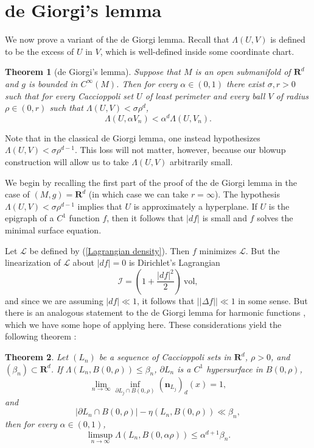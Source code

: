\documentclass[reqno,12pt,letterpaper]{amsart}
\newcommand{\RR}{\mathbf{R}}
\newcommand{\normal}{\mathbf n}
\newcommand{\vol}{\mathrm{vol}}
\newtheorem{theorem}{Theorem}[section]
\theoremstyle{definition}
\numberwithin{equation}{section}
\begin{document}

\section{de Giorgi's lemma}\label{DGL section}
We now prove a variant of the de Giorgi lemma. Recall that $\Lambda(U, V)$ is defined to be the excess of $U$ in $V$, which is well-defined inside some coordinate chart.

\begin{theorem}[de Giorgi's lemma]\label{DGL}
Suppose that $M$ is an open submanifold of $\RR^d$ and $g$ is bounded in $C^\infty(M)$.
Then for every $\alpha \in (0, 1)$ there exist $\sigma, r > 0$ such that for every Caccioppoli set $U$ of least perimeter and every ball $V$ of radius $\rho \in (0, r)$ such that $\Lambda(U, V) < \sigma \rho^d$,
$$\Lambda(U, \alpha V_n) < \alpha^d \Lambda(U, V_n).$$
\end{theorem}

Note that in the classical de Giorgi lemma, one instead hypothesizes $\Lambda(U, V) < \sigma \rho^{d - 1}$.
This loss will not matter, however, because our blowup construction will allow us to take $\Lambda(U, V)$ arbitrarily small.

We begin by recalling the first part of the proof of the de Giorgi lemma in the case of $(M, g) = \RR^d$ (in which case we can take $r = \infty$).
The hypothesis $\Lambda(U, V) < \sigma \rho^{d - 1}$ implies that $U$ is approximately a hyperplane.
If $U$ is the epigraph of a $C^1$ function $f$, then it follows that $|df|$ is small and $f$ solves the minimal surface equation.

Let $\mathscr L$ be defined by (\ref{Lagrangian density}). Then $f$ minimizes $\mathscr L$.
But the linearization of $\mathscr L$ about $|df| = 0$ is Dirichlet's Lagrangian
$$\mathscr I = (1 + \frac{|df|^2}{2}) ~\vol,$$
and since we are assuming $|df| \ll 1$, it follows that $||\Delta f|| \ll 1$ in some sense.
But there is an analogous statement to the de Giorgi lemma for harmonic functions \cite[Lemma 4.1]{Miranda66}, which we have some hope of applying here.
These considerations yield the following theorem \cite[Teorema 4.4]{Miranda66}:

\begin{theorem}\label{DGL C1}
Let $(L_n)$ be a sequence of Caccioppoli sets in $\RR^d$, $\rho > 0$, and $(\beta_n) \subset \RR^d$.
If $\Lambda(L_n, B(0, \rho)) \leq \beta_n$, $\partial L_n$ is a $C^1$ hypersurface in $B(0, \rho)$,
$$\lim_{n \to \infty} \inf_{\partial L_j \cap B(0, \rho)} (\normal_{L_j})_d(x) = 1,$$
and
$$|\partial L_n \cap B(0, \rho)| - \eta(L_n, B(0, \rho)) \ll \beta_n,$$
then for every $\alpha \in (0, 1)$,
$$\limsup_{n \to \infty} \Lambda(L_n, B(0, \alpha \rho)) \leq \alpha^{d + 1} \beta_n.$$
\end{theorem}
\end{document}
